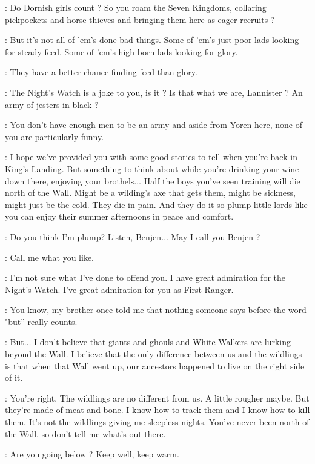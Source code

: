 \TYRION: Do Dornish girls count ? So you roam the Seven Kingdoms, collaring pickpockets and horse thieves and bringing them here as eager recruits ? 

\YOREN: But it's not all of 'em's done bad things. Some of 'em's just poor lads looking for steady feed. Some of 'em's high-born lads looking for glory. 

\TYRION: They have a better chance finding feed than glory. 


\BENJEN: The Night's Watch is a joke to you, is it ? Is that what we are, Lannister ? An army of jesters in black ? 

\TYRION: You don't have enough men to be an army and aside from Yoren here, none of you are particularly funny. 

\BENJEN: I hope we've provided you with some good stories to tell when you're back in King's Landing. But something to think about while you're drinking your wine down there, enjoying your brothels$\ldots$ Half the boys you've seen training will die north of the Wall. Might be a wilding's axe that gets them, might be sickness, might just be the cold. They die in pain. And they do it so plump little lords like you can enjoy their summer afternoons in peace and comfort. 

\TYRION:  Do you think I'm plump? Listen, Benjen$\ldots$ May I call you Benjen ? 

\BENJEN: Call me what you like. 

\TYRION: I'm not sure what I've done to offend you. I have great admiration for the Night's Watch. I've great admiration for you as First Ranger. 

\BENJEN: You know, my brother once told me that nothing someone says before the word "but'' really counts. 

\TYRION: But$\ldots$ I don't believe that giants and ghouls and White Walkers are lurking beyond the Wall. I believe that the only difference between us and the wildlings is that when that Wall went up, our ancestors happened to live on the right side of it. 

\BENJEN: You're right. The wildlings are no different from us. A little rougher maybe. But they're made of meat and bone. I know how to track them and I know how to kill them. It's not the wildlings giving me sleepless nights. You've never been north of the Wall, so don't tell me what's out there. 

\YOREN: Are you going below ? Keep well, keep warm. 

